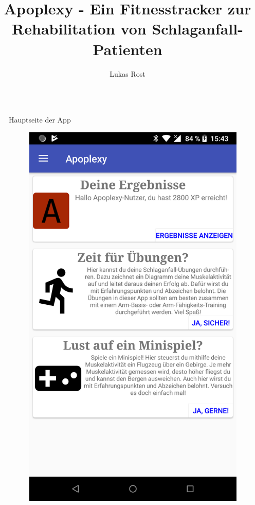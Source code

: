 \documentclass[final,20pt]{beamer}
\title{Apoplexy - Ein Fitnesstracker zur Rehabilitation von Schlaganfall-Patienten}
\author{Lukas Rost}
\institute{Albert-Schweitzer-Gymnasium Erfurt}
\newlength{\sepwidth}
\newlength{\colwidth}
\newcommand{\separatorcolumn}{\begin{column}{\sepwidth}\end{column}}
\begin{document}
\begin{frame}[t]

\vspace{3cm}

\begin{columns}[t]
\separatorcolumn

\begin{column}{\colwidth}
   \begin{alertblock}{Hauptseite der App}
   	\begin{figure}[H]
   		\centering
   		\includegraphics[width=0.6\colwidth]{pics/device-home}
   	\end{figure}
  \end{alertblock}


\end{column}
\end{columns}
\end{frame}
\end{document}
